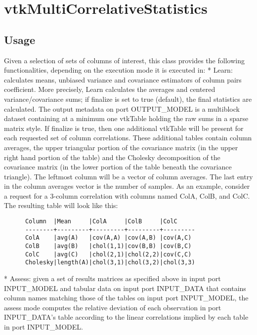 \section{vtkMultiCorrelativeStatistics}

\subsection{Usage}

 Given a selection of sets of columns of interest, this class provides the
 following functionalities, depending on the execution mode it is executed in:
 * Learn: calculates means, unbiased variance and covariance estimators of
   column pairs coefficient.
   More precisely, Learn calculates the averages and centered
   variance/covariance sums; if  finalize is set to true (default),
   the final statistics are calculated.
   The output metadata on port OUTPUT\_MODEL is a multiblock dataset containing at a minimum
   one vtkTable holding the raw sums in a sparse matrix style. If  finalize is
   true, then one additional vtkTable will be present for each requested set of
   column correlations. These additional tables contain column averages, the
   upper triangular portion of the covariance matrix (in the upper right hand
   portion of the table) and the Cholesky decomposition of the covariance matrix
   (in the lower portion of the table beneath the covariance triangle).
   The leftmost column will be a vector of column averages.
   The last entry in the column averages vector is the number of samples.
   As an example, consider a request for a 3-column correlation with columns
   named ColA, ColB, and ColC.
   The resulting table will look like this:
   \begin{verbatim}
      Column  |Mean     |ColA     |ColB     |ColC
      --------+---------+---------+---------+---------
      ColA    |avg(A)   |cov(A,A) |cov(A,B) |cov(A,C)
      ColB    |avg(B)   |chol(1,1)|cov(B,B) |cov(B,C)
      ColC    |avg(C)   |chol(2,1)|chol(2,2)|cov(C,C)
      Cholesky|length(A)|chol(3,1)|chol(3,2)|chol(3,3)
   \end{verbatim}
 * Assess: given a set of results matrices as specified above in input port INPUT\_MODEL and
   tabular data on input port INPUT\_DATA that contains column names matching those
   of the tables on input port INPUT\_MODEL, the assess mode computes the relative
   deviation of each observation in port INPUT\_DATA's table according to the linear
   correlations implied by each table in port INPUT\_MODEL.
  

